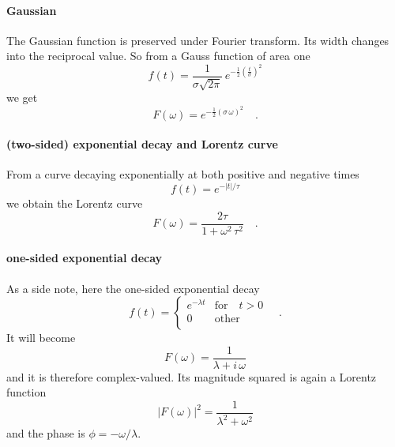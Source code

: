 \paragraph{Gaussian} The Gaussian function is preserved under Fourier transform. Its width changes into the reciprocal value. So from a Gauss function of area one
\begin{equation}
 f(t) = \frac{1}{\sigma \sqrt{2 \pi}} \, e^{- \frac{1}{2} \left( \frac{t}{\sigma} \right)^2}
\end{equation}
we get
\begin{equation}
 F(\omega) = e^{- \frac{1}{2} \left( \sigma \, \omega \right) ^2 } \quad .
\end{equation}



\paragraph{(two-sided) exponential decay and Lorentz curve} From a curve decaying exponentially at both positive and negative times
\begin{equation}
 f(t) = e^{- |t| / \tau}
\end{equation}
we obtain the Lorentz curve
\begin{equation}
 F(\omega) = \frac{2 \tau}{1 + \omega^2 \, \tau^2} \quad .
\end{equation}


\paragraph{one-sided exponential decay} As a side note, here  the one-sided exponential decay
\begin{equation}
 f(t) = \left\{ \begin{array}{ll}
e^{- \lambda t } & \text{for} \quad t > 0 \\
 0 & \text{other} \\
 \end{array}
 \right. \quad .
\end{equation}
It will become
\begin{equation}
 F(\omega) = \frac{1}{\lambda + i \, \omega}
\end{equation}
and it is therefore complex-valued. Its magnitude squared is again a Lorentz function
\begin{equation}
| F(\omega)|^2 = \frac{1}{\lambda^2 + \omega^2}
\end{equation}
and the phase is $\phi = - \omega / \lambda$.


